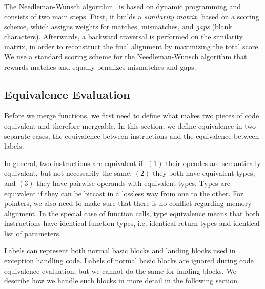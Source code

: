 The Needleman-Wunsch algorithm~\cite{needleman70} is based on dynamic programming and consists of two main steps. First, it builds a \textit{similarity matrix}, based on a scoring scheme, which assigns weights
for matches, mismatches, and \textit{gaps} (blank characters). Afterwards, a backward traversal is performed on the similarity matrix, in
order to reconstruct the final alignment by maximizing the total score. We use a standard scoring scheme for the Needleman-Wunsch algorithm
that rewards matches and equally penalizes mismatches and gaps.



\subsection{Equivalence Evaluation}

Before we merge functions, we first need to define what makes two pieces of code equivalent and
therefore mergeable. In this section, we define equivalence in two separate cases, the equivalence
between instructions and the equivalence between labels.

In general, two instructions are equivalent if: $(1)$ their opcodes are semantically equivalent,
but not necessarily the same; $(2)$ they both have equivalent types; and $(3)$ they have pairwise
operands with equivalent types. Types are equivalent if they can be bitcast in a lossless way from one to
the other. For pointers, we also need to make sure that there is no conflict regarding memory alignment.
In the special case of function calls, type equivalence means that both instructions have identical
function types, i.e. identical return types and identical list of parameters.

Labels can represent both normal basic blocks and landing blocks used in exception handling code.
Labels of normal basic blocks are ignored during code equivalence evaluation, but we cannot do the
same for landing blocks. We describe how we handle such blocks in more detail in the following section.

